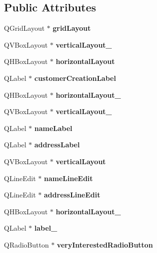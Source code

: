 \subsection*{Public Attributes}
\begin{DoxyCompactItemize}
\item 
\mbox{\label{class_ui__addmember_a3d2b28e911f9c54729980ab3faa7f09d}} 
Q\+Grid\+Layout $\ast$ {\bfseries grid\+Layout}
\item 
\mbox{\label{class_ui__addmember_ae837d7c4cfcc0dd0bdac5c8f220b82b1}} 
Q\+V\+Box\+Layout $\ast$ {\bfseries vertical\+Layout\+\_}
\item 
\mbox{\label{class_ui__addmember_a0a28ed487fa2d3ef8aca9a31ad3de7f6}} 
Q\+H\+Box\+Layout $\ast$ {\bfseries horizontal\+Layout}
\item 
\mbox{\label{class_ui__addmember_aa3b460720e66a24e8ddc537ddefd365d}} 
Q\+Label $\ast$ {\bfseries customer\+Creation\+Label}
\item 
\mbox{\label{class_ui__addmember_a7c3430de58782790c3dbcbdaf79da076}} 
Q\+H\+Box\+Layout $\ast$ {\bfseries horizontal\+Layout\+\_}
\item 
\mbox{\label{class_ui__addmember_a7956e63700a4cdad5b6a5e985d37fd58}} 
Q\+V\+Box\+Layout $\ast$ {\bfseries vertical\+Layout\+\_}
\item 
\mbox{\label{class_ui__addmember_a267b76c90bd528e077ad5e8041f337a7}} 
Q\+Label $\ast$ {\bfseries name\+Label}
\item 
\mbox{\label{class_ui__addmember_a1004349e48467ad1a11dc7344a069b83}} 
Q\+Label $\ast$ {\bfseries address\+Label}
\item 
\mbox{\label{class_ui__addmember_a3f0819b8031e5a50af8c4c9ddbb3dab9}} 
Q\+V\+Box\+Layout $\ast$ {\bfseries vertical\+Layout}
\item 
\mbox{\label{class_ui__addmember_a752a627d1d06fcee2a4ba0c42d14b731}} 
Q\+Line\+Edit $\ast$ {\bfseries name\+Line\+Edit}
\item 
\mbox{\label{class_ui__addmember_ae156db928a12dbaac4fbca83a5733200}} 
Q\+Line\+Edit $\ast$ {\bfseries address\+Line\+Edit}
\item 
\mbox{\label{class_ui__addmember_a68338cfcd8e47d1e12c57bab504bae7d}} 
Q\+H\+Box\+Layout $\ast$ {\bfseries horizontal\+Layout\+\_}
\item 
\mbox{\label{class_ui__addmember_a5098e54ce08ab5d213a29ba78886ac55}} 
Q\+Label $\ast$ {\bfseries label\+\_}
\item 
\mbox{\label{class_ui__addmember_acd664ec70ec5bc1f45f0e659a97454de}} 
Q\+Radio\+Button $\ast$ {\bfseries very\+Interested\+Radio\+Button}

\end{DoxyCompactItemize}
